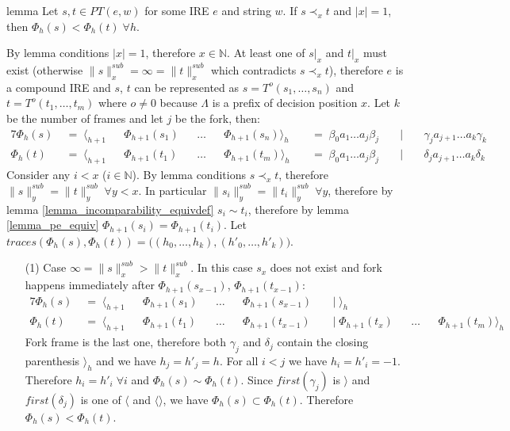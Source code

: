 \documentclass[AMA,STIX1COL]{WileyNJD-v2}
\newcommand{\Xl}{\langle}
\newcommand{\Xr}{\rangle}
\newcommand{\Xm}{\langle\!\rangle}
\newcommand{\YN}{\mathbb{N}}
\newcommand{\PT}{PT}
\newcommand{\snorm}[2]{\|{#1}\|^{sub}_{#2}}
\begin{document}
\begin{theoremEnd}{lemma}
    \label{lemma_pe_less_1}
    Let $s, t \in \PT(e, w)$ for some IRE $e$ and string $w$.
    If $s \prec_x t$ and $|x| = 1$, then $\Phi_{h}(s) < \Phi_{h}(t) \; \forall h$.
\end{theoremEnd}
\begin{proofEnd}
    By lemma conditions $|x| = 1$, therefore $x \in \YN$.
    At least one of $s|_x$ and $t|_x$ must exist (otherwise $\snorm{s}{x} = \infty = \snorm{t}{x}$ which contradicts $s \prec_x t$),
    therefore $e$ is a compound IRE and $s$, $t$ can be represented as
    $s = T^{o} (s_1, \dots, s_n)$ and
    $t = T^{o} (t_1, \dots, t_m)$
    where $o \neq 0$ because $\Lambda$ is a prefix of decision position $x$.
    Let $k$ be the number of frames and let $j$ be the fork, then:
    \begin{alignat*}{7}
        \Phi_{h}(s) &\;=\; \Xl_{h+1} &&\Phi_{h+1}(s_1) &&\dots &&\Phi_{h+1}(s_n) \Xr_h
            &&\;=\; \beta_0 a_1 \dots a_j \beta_j &&\;\big|\; && \gamma_j a_{j + 1} \dots a_k \gamma_k \\[-0.5em]
        \Phi_{h}(t) &\;=\; \Xl_{h+1} &&\Phi_{h+1}(t_1) &&\dots &&\Phi_{h+1}(t_m) \Xr_h
            &&\;=\; \beta_0 a_1 \dots a_j \beta_j &&\;\big|\; && \delta_j a_{j + 1} \dots a_k \delta_k
    \end{alignat*}
%
    Consider any $i < x$ ($i \in \YN$).
    By lemma conditions $s \prec_x t$, therefore $\snorm{s}{y} = \snorm{t}{y} \;\forall y < x$.
    In particular $\snorm{s_i}{y} = \snorm{t_i}{y} \;\forall y$, therefore
    by lemma \ref{lemma_incomparability_equivdef} $s_i \sim t_i$,
    therefore by lemma \ref{lemma_pe_equiv} $\Phi_{h+1}(s_i) = \Phi_{h+1}(t_i)$.
    Let $traces (\Phi_{h}(s), \Phi_{h}(t)) = \big( (h_0, \dots, h_k), (h'_0, \dots, h'_k) \big)$.

    \begin{itemize}[itemsep=0.2em, topsep=0.5em]
    \item[(1)]
        Case $\infty = \snorm{s}{x} > \snorm{t}{x}$.
        In this case $s_x$ does not exist
        and fork happens immediately after $\Phi_{h+1}(s_{x-1})$, $\Phi_{h+1}(t_{x-1})$:
        \begin{alignat*}{7}
            \Phi_{h}(s) &\;=\; \Xl_{h+1} &&\Phi_{h+1}(s_1) &&\dots &&\Phi_{h+1}(s_{x-1})
                &&\;\big|\; \Xr_{h}         &&      && \\[-0.5em]
            \Phi_{h}(t) &\;=\; \Xl_{h+1} &&\Phi_{h+1}(t_1) &&\dots &&\Phi_{h+1}(t_{x-1})
                &&\;\big|\; \Phi_{h+1}(t_x) &&\dots &&\Phi_{h+1}(t_m) \Xr_{h}
        \end{alignat*}
        Fork frame is the last one,
        therefore both $\gamma_j$ and $\delta_j$ contain the closing parenthesis $\Xr_{h}$
        and we have $h_j = h'_j = h$.
        For all $i < j$ we have $h_i = h'_i = -1$.
        Therefore $h_i = h'_i \;\forall i$ and $\Phi_{h}(s) \sim \Phi_{h}(t)$.
        Since $first(\gamma_j)$ is $\Xr$ and $first(\delta_j)$ is one of $\Xl$ and $\Xm$,
        we have $\Phi_{h}(s) \subset \Phi_{h}(t)$.
        Therefore $\Phi_{h}(s) < \Phi_{h}(t)$.


\end{itemize}
\end{proofEnd}
\end{document}
